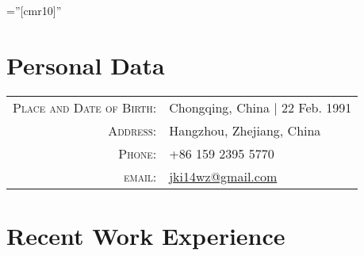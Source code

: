\documentclass[a4paper,10pt]{article}
\begin{document}

\pagestyle{empty} %

\font\fb=''[cmr10]'' %

\par{\bigskip\par}


\section{Personal Data}

\begin{tabular}{rl}
    \textsc{Place and Date of Birth:} & Chongqing, China  | 22 Feb. 1991 \\
    \textsc{Address:} & Hangzhou, Zhejiang, China \\
    \textsc{Phone:} & +86 159 2395 5770\\
    \textsc{email:} & \href{mailto:jki14wz@gmail.com}{jki14wz@gmail.com}
\end{tabular}

\section{Recent Work Experience}
\end{document}
